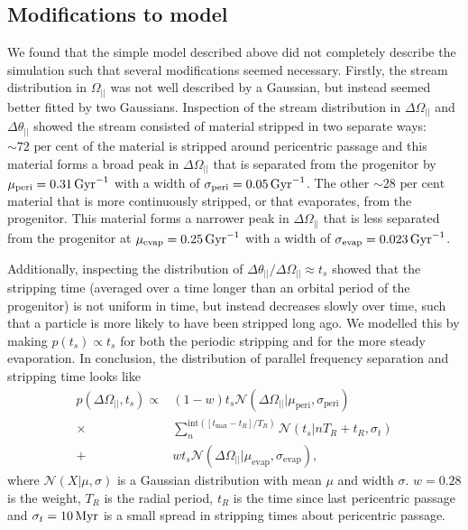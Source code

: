 \documentclass[useAMS,usenatbib,fleqn,a4paper]{mn2e}
\def\Gyr{\,{\rm Gyr}}
\def\Myr{\,{\rm Myr}}
\def\percent{\text{ per cent}}
\def\percent{\text{ per cent}}
\begin{document}
\subsection{Modifications to model}
We found that the simple model described above did not completely describe the simulation such that several modifications seemed necessary. Firstly, the stream distribution in $\Omega_{||}$ was not well described by a Gaussian, but instead seemed better fitted by two Gaussians. Inspection of the stream distribution in $\Delta\Omega_{||}$ and $\Delta\theta_{||}$ showed the stream consisted of material stripped in two separate ways: $\sim72\percent$ of the material is stripped around pericentric passage and this material forms a broad peak in $\Delta\Omega_{||}$ that is separated from the progenitor by $\mu_\mathrm{peri}=0.31\Gyr^{-1}$ with a width of $\sigma_\mathrm{peri}=0.05\Gyr^{-1}$. The other $\sim28\percent$ material that is more continuously stripped, or that evaporates, from the progenitor. This material forms a narrower peak in $\Delta\Omega_{||}$ that is less separated from the progenitor at $\mu_\mathrm{evap}=0.25\Gyr^{-1}$ with a width of $\sigma_\mathrm{evap}=0.023\Gyr^{-1}$.

Additionally, inspecting the distribution of $\Delta\theta_{||}/\Delta\Omega_{||}\approx t_s$ showed that the stripping time (averaged over a time longer than an orbital period of the progenitor) is not uniform in time, but instead decreases slowly over time, such that a particle is more likely to have been stripped long ago. We modelled this by making $p(t_s)\propto t_s$ for both the periodic stripping and for the more steady evaporation. In conclusion, the distribution of parallel frequency separation and stripping time looks like
\begin{equation}
\begin{split}
p(\Delta\Omega_{||},t_s) \propto &(1-w)t_s\mathcal{N}(\Delta\Omega_{||}|\mu_\mathrm{peri},\sigma_\mathrm{peri})\\\times&\sum_n^{\mathrm{int}([t_\mathrm{max}-t_R]/T_R)}\mathcal{N}(t_s|nT_R+t_R,\sigma_t)\\+&wt_s\mathcal{N}(\Delta\Omega_{||}|\mu_\mathrm{evap},\sigma_\mathrm{evap}),
\end{split}
\end{equation}
where $\mathcal{N}(X|\mu,\sigma)$ is a Gaussian distribution with mean $\mu$ and width $\sigma$. $w=0.28$ is the weight, $T_R$ is the radial period, $t_R$ is the time since last pericentric passage and $\sigma_t=10\Myr$ is a small spread in stripping times about pericentric passage.
\end{document}
